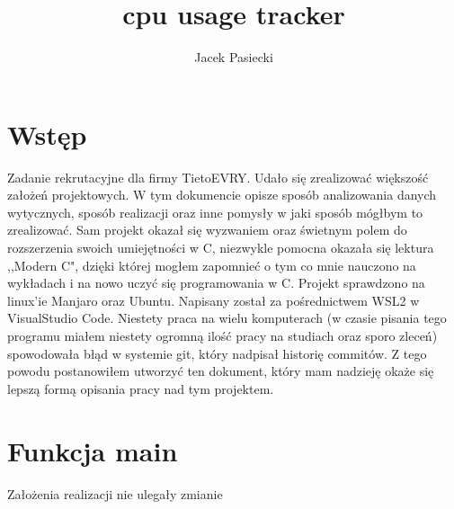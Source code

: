\documentclass[10pt,a4paper]{article}
\author{Jacek Pasiecki}
\title{cpu usage tracker}
\begin{document}
\maketitle
\section{Wstęp}
Zadanie rekrutacyjne dla firmy TietoEVRY. Udało się zrealizować większość założeń projektowych. W tym dokumencie opisze sposób analizowania danych wytycznych, sposób realizacji oraz inne pomysły w jaki sposób mógłbym to zrealizować. Sam projekt okazał się wyzwaniem oraz świetnym polem do rozszerzenia swoich umiejętności w C, niezwykle pomocna okazała się lektura ,,Modern C", dzięki której mogłem zapomnieć o tym co mnie nauczono na wykładach i na nowo uczyć się programowania w C. Projekt sprawdzono na linux'ie Manjaro oraz Ubuntu. Napisany został za pośrednictwem WSL2 w VisualStudio Code. Niestety praca na wielu komputerach (w czasie pisania tego programu miałem niestety ogromną ilość pracy na studiach oraz sporo zleceń) spowodowała błąd w systemie git, który nadpisał historię commitów. Z tego powodu postanowiłem utworzyć ten dokument, który mam nadzieję okaże się lepszą formą opisania pracy nad tym projektem.
\section{Funkcja main}
Założenia realizacji nie ulegały zmianie
\end{document}
